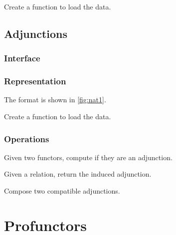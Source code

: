 \begin{exercise}
Create a function to load the data.

%
\end{exercise}


\section{Adjunctions}

\subsection*{Interface}

\subsection*{Representation}

The format is shown in \cref{fig:nat1}.



\begin{exercise}
Create a function to load the data.

%
\end{exercise}

\subsection{Operations}
\begin{exercise}
Given two functors, compute if they are an adjunction.

\end{exercise}

\begin{exercise}
Given a relation, return the induced adjunction.
\end{exercise}


\begin{exercise}
Compose two compatible adjunctions.
\end{exercise}


\chapter{Profunctors}



